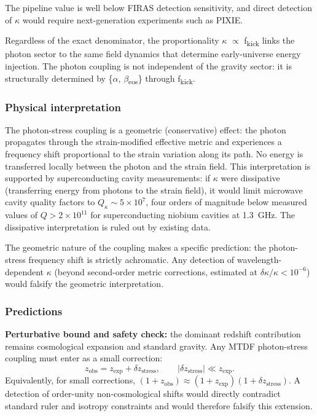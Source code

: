 \documentclass[11pt,a4paper]{article}
\begin{document}
The pipeline value is well below FIRAS detection sensitivity, and direct detection of $\kappa$ would require next-generation experiments such as PIXIE.

Regardless of the exact denominator, the proportionality $\kappa$ $\propto$ f\textsubscript{kick} links the photon sector to the same field dynamics that determine early-universe energy injection. The photon coupling is not independent of the gravity sector: it is structurally determined by \{$\alpha$, $\beta$\textsubscript{eos}\} through f\textsubscript{kick}.

\subsubsection{Physical interpretation}
The photon-stress coupling is a geometric (conservative) effect: the photon propagates through the strain-modified effective metric and experiences a frequency shift proportional to the strain variation along its path. No energy is transferred locally between the photon and the strain field. This interpretation is supported by superconducting cavity measurements: if \(\kappa\) were dissipative (transferring energy from photons to the strain field), it would limit microwave cavity quality factors to \(Q_\kappa \sim 5 \times 10^7\), four orders of magnitude below measured values of \(Q > 2 \times 10^{11}\) for superconducting niobium cavities at 1.3~GHz. The dissipative interpretation is ruled out by existing data.

The geometric nature of the coupling makes a specific prediction: the photon-stress frequency shift is strictly achromatic. Any detection of wavelength-dependent \(\kappa\) (beyond second-order metric corrections, estimated at \(\delta\kappa/\kappa < 10^{-6}\)) would falsify the geometric interpretation.

\subsubsection{Predictions}
\textbf{Perturbative bound and safety check:} the dominant redshift contribution remains cosmological expansion and standard gravity.
Any MTDF photon-stress coupling must enter as a small correction:
\[
z_{\mathrm{obs}} = z_{\mathrm{exp}} + \delta z_{\mathrm{stress}}, \qquad \lvert \delta z_{\mathrm{stress}}\rvert \ll z_{\mathrm{exp}}.
\]
Equivalently, for small corrections, \( (1+z_{\mathrm{obs}}) \approx (1+z_{\mathrm{exp}})(1+\delta z_{\mathrm{stress}}) \).
A detection of order-unity non-cosmological shifts would directly contradict standard ruler and isotropy constraints and would therefore falsify this extension.
\end{document}
